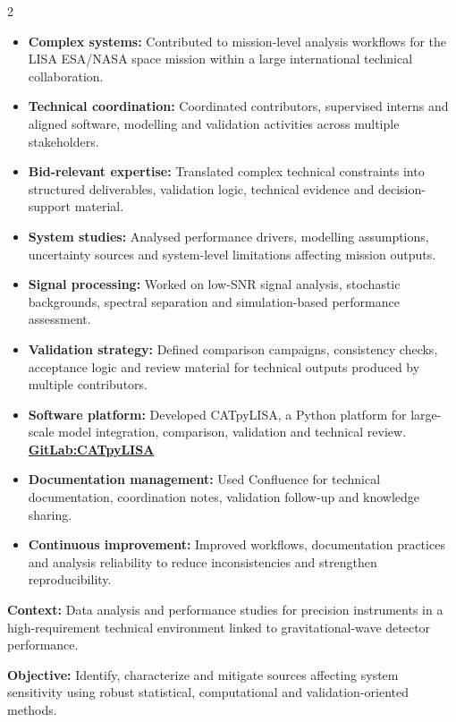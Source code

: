 \documentclass[8pt,a4paper,ragged2e,withhyper]{altacv}
\begin{document}
\begin{paracol}{2}
\begin{itemize}
  \item \textbf{Complex systems:} Contributed to mission-level analysis workflows for the LISA ESA/NASA space mission within a large international technical collaboration.
  \item \textbf{Technical coordination:} Coordinated contributors, supervised interns and aligned software, modelling and validation activities across multiple stakeholders.
  \item \textbf{Bid-relevant expertise:} Translated complex technical constraints into structured deliverables, validation logic, technical evidence and decision-support material.
  \item \textbf{System studies:} Analysed performance drivers, modelling assumptions, uncertainty sources and system-level limitations affecting mission outputs.
  \item \textbf{Signal processing:} Worked on low-SNR signal analysis, stochastic backgrounds, spectral separation and simulation-based performance assessment.
  \item \textbf{Validation strategy:} Defined comparison campaigns, consistency checks, acceptance logic and review material for technical outputs produced by multiple contributors.
  \item \textbf{Software platform:} Developed CATpyLISA, a Python platform for large-scale model integration, comparison, validation and technical review.
  \textcolor{DarkPastelRed}{\href{https://gitlab.oca.eu/gboileau/lisa_l3_tools}{\bf GitLab:CATpyLISA}}
  \item \textbf{Documentation management:} Used Confluence for technical documentation, coordination notes, validation follow-up and knowledge sharing.
  \item \textbf{Continuous improvement:} Improved workflows, documentation practices and analysis reliability to reduce inconsistencies and strengthen reproducibility.
\end{itemize}

\divider


\textbf{Context:} Data analysis and performance studies for precision instruments in a high-requirement technical environment linked to gravitational-wave detector performance.

\textbf{Objective:} Identify, characterize and mitigate sources affecting system sensitivity using robust statistical, computational and validation-oriented methods.


\end{paracol}
\end{document}

